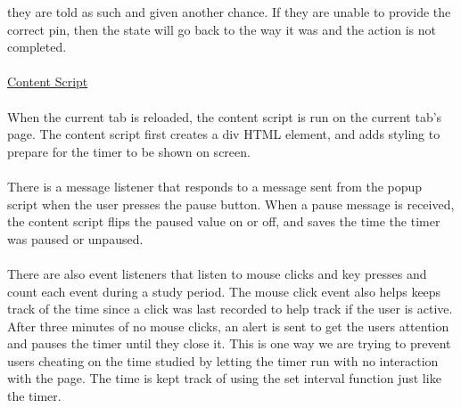 \documentclass[12pt]{article}
\begin{document}
they are told as such and given another chance. If they are unable to provide the correct pin, then the state will go back to the way it was and the action is not completed. 
\\\\
\noindent
\underline{Content Script}\\\\
\indent When the current tab is reloaded, the content script is run on the current tab's page. The content script first creates a div HTML element, and adds styling to prepare
for the timer to be shown on screen. \\\\
\indent There is a message listener that responds to a message sent from the popup script
when the user presses the pause button. When a pause message is received, the content script flips the paused value on or off, and saves the time the timer was paused or unpaused.\\\\
\indent There are also event listeners that listen to mouse clicks and key presses and count each event during a study period. The mouse click event also helps keeps track of the time since a click 
was last recorded to help track if the user is active. After three minutes of no mouse clicks, an alert is sent to get the users attention and pauses the timer until they close it. This is one way we 
are trying to prevent users cheating on the time studied by letting the timer run with no interaction with the page. The time is kept track of using the set interval function just like the timer. \\
\end{document}
